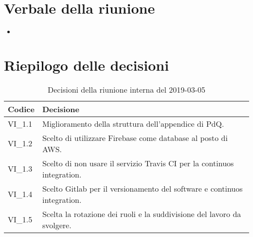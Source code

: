 \section{Verbale della riunione}
\begin{itemize}
	\item 
\end{itemize} 
\pagebreak
\section{Riepilogo delle decisioni}

	
	\begin{longtable}{ >{\centering}p{} >{}p{}}
		\caption{Decisioni della riunione interna del 2019-03-05}\\	
		\rowcolorhead
		\textbf{\color{white}Codice} 
		& \centering\textbf{\color{white}Decisione} 
		\tabularnewline 
		\endfirsthead
		VI\_1.1 & Miglioramento della struttura dell'appendice di PdQ.
		
		\tabularnewline 
		VI\_1.2 & Scelto di utilizzare Firebase come database al posto di AWS.
		
		\tabularnewline 
		VI\_1.3 & Scelto di non usare il servizio Travis CI per la continuos integration.
	
		\tabularnewline 
		VI\_1.4 & Scelto Gitlab per il versionamento del software e continuos integration.
		
		\tabularnewline 
		VI\_1.5 & Scelta la rotazione dei ruoli e la suddivisione del lavoro da svolgere.
	
	\end{longtable}
	




